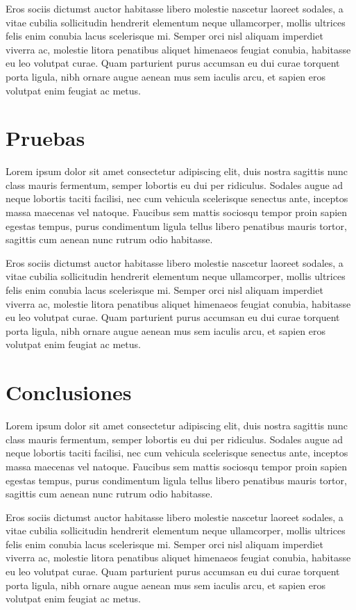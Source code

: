 \documentclass{article}
\begin{document}
Eros sociis dictumst auctor habitasse libero molestie nascetur laoreet sodales, a vitae cubilia sollicitudin hendrerit elementum neque ullamcorper, mollis ultrices felis enim conubia lacus scelerisque mi. Semper orci nisl aliquam imperdiet viverra ac, molestie litora penatibus aliquet himenaeos feugiat conubia, habitasse eu leo volutpat curae. Quam parturient purus accumsan eu dui curae torquent porta ligula, nibh ornare augue aenean mus sem iaculis arcu, et sapien eros volutpat enim feugiat ac metus.
\newpage

\section{Pruebas}
Lorem ipsum dolor sit amet consectetur adipiscing elit, duis nostra sagittis nunc class mauris fermentum, semper lobortis eu dui per ridiculus. Sodales augue ad neque lobortis taciti facilisi, nec cum vehicula scelerisque senectus ante, inceptos massa maecenas vel natoque. Faucibus sem mattis sociosqu tempor proin sapien egestas tempus, purus condimentum ligula tellus libero penatibus mauris tortor, sagittis cum aenean nunc rutrum odio habitasse.

Eros sociis dictumst auctor habitasse libero molestie nascetur laoreet sodales, a vitae cubilia sollicitudin hendrerit elementum neque ullamcorper, mollis ultrices felis enim conubia lacus scelerisque mi. Semper orci nisl aliquam imperdiet viverra ac, molestie litora penatibus aliquet himenaeos feugiat conubia, habitasse eu leo volutpat curae. Quam parturient purus accumsan eu dui curae torquent porta ligula, nibh ornare augue aenean mus sem iaculis arcu, et sapien eros volutpat enim feugiat ac metus.
\newpage

\section{Conclusiones}
Lorem ipsum dolor sit amet consectetur adipiscing elit, duis nostra sagittis nunc class mauris fermentum, semper lobortis eu dui per ridiculus. Sodales augue ad neque lobortis taciti facilisi, nec cum vehicula scelerisque senectus ante, inceptos massa maecenas vel natoque. Faucibus sem mattis sociosqu tempor proin sapien egestas tempus, purus condimentum ligula tellus libero penatibus mauris tortor, sagittis cum aenean nunc rutrum odio habitasse.

Eros sociis dictumst auctor habitasse libero molestie nascetur laoreet sodales, a vitae cubilia sollicitudin hendrerit elementum neque ullamcorper, mollis ultrices felis enim conubia lacus scelerisque mi. Semper orci nisl aliquam imperdiet viverra ac, molestie litora penatibus aliquet himenaeos feugiat conubia, habitasse eu leo volutpat curae. Quam parturient purus accumsan eu dui curae torquent porta ligula, nibh ornare augue aenean mus sem iaculis arcu, et sapien eros volutpat enim feugiat ac metus.
\newpage
\end{document}
